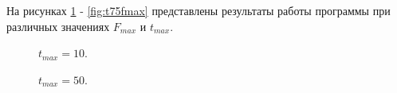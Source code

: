\documentclass[a4paper,14pt]{article}
\begin{document}
На рисунках \ref{fig:t10fmax} - \ref{fig:t75fmax}
представлены результаты работы программы при различных значениях
$F_{max}$ и $t_{max}$.

\newpage
\begin{figure}[!h]
	\caption{$t_{max}=10$.}
	\label{fig:t10fmax}
\end{figure}
\newpage
\begin{figure}[!h]
	\caption{$t_{max}=50$.}
	\label{fig:t50fmax}
\end{figure}
\end{document}
